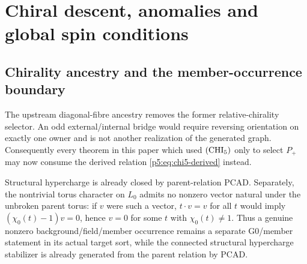 \documentclass[12pt,a4paper]{article}
\begin{document}
\section{Chiral descent, anomalies and global spin conditions}
\label{p5a:sec:organized-chirality}
\subsection{Chirality ancestry and the member-occurrence boundary}
\label{p5:sec:g4-update}

The upstream diagonal-fibre ancestry removes the former relative-chirality
selector.  An odd external/internal bridge would require reversing orientation
on exactly one owner and is not another realization of the generated graph.
Consequently every theorem in this paper which used $({\rm CHI}_5)$ only to
select $P_+$ may now consume the derived relation
\eqref{p5:eq:chi5-derived} instead.

Structural hypercharge is already closed by parent-relation PCAD.  Separately,
the nontrivial torus character on $L_0$ admits no nonzero vector natural under
the unbroken parent torus:
if $v$ were such a vector, $t\cdot v=v$ for all $t$ would imply
$(\chi_0(t)-1)v=0$, hence $v=0$ for some $t$ with $\chi_0(t)\ne1$.
Thus a genuine nonzero background/field/member occurrence remains a separate
G0/member statement in its actual target sort, while the connected structural
hypercharge stabilizer is already generated from the parent relation by PCAD.
\end{document}
